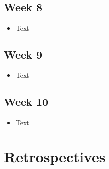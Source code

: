 \documentclass[10pt, onecolumn, draftclsnofoot, letterpaper, compsoc]{IEEEtran}
\begin{document}
\subsection{Week 8}

\begin{itemize}

\item Text

\end{itemize}

\subsection{Week 9}

\begin{itemize}

\item Text

\end{itemize}

\subsection{Week 10}

\begin{itemize}

\item Text

\end{itemize}

\section{Retrospectives}
\end{document}
